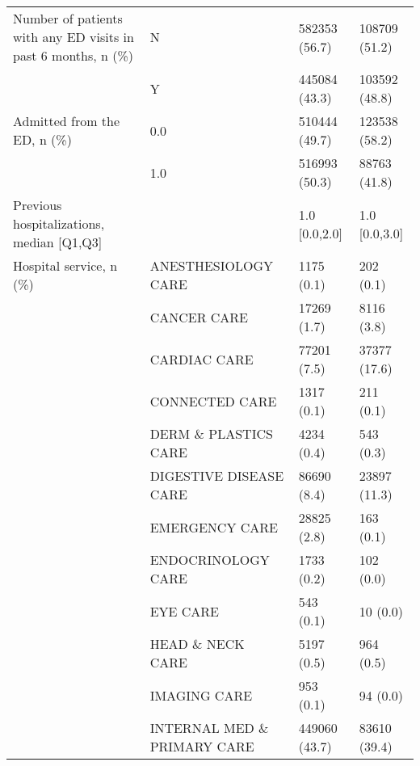 \begin{tabular}{llll}
Number of patients with any ED visits in past 6 months, n (\%) & N &                         582353 (56.7) &     108709 (51.2) \\
                                       & Y &                         445084 (43.3) &     103592 (48.8) \\
Admitted from the ED, n (\%) & 0.0 &                         510444 (49.7) &     123538 (58.2) \\
                                       & 1.0 &                         516993 (50.3) &      88763 (41.8) \\
Previous hospitalizations, median [Q1,Q3] &   &                         1.0 [0.0,2.0] &     1.0 [0.0,3.0] \\
Hospital service, n (\%) & ANESTHESIOLOGY CARE &                            1175 (0.1) &         202 (0.1) \\
                                       & CANCER CARE &                           17269 (1.7) &        8116 (3.8) \\
                                       & CARDIAC CARE &                           77201 (7.5) &      37377 (17.6) \\
                                       & CONNECTED CARE &                            1317 (0.1) &         211 (0.1) \\
                                       & DERM \& PLASTICS CARE &                            4234 (0.4) &         543 (0.3) \\
                                       & DIGESTIVE DISEASE CARE &                           86690 (8.4) &      23897 (11.3) \\
                                       & EMERGENCY CARE &                           28825 (2.8) &         163 (0.1) \\
                                       & ENDOCRINOLOGY CARE &                            1733 (0.2) &         102 (0.0) \\
                                       & EYE CARE &                             543 (0.1) &          10 (0.0) \\
                                       & HEAD \& NECK CARE &                            5197 (0.5) &         964 (0.5) \\
                                       & IMAGING CARE &                             953 (0.1) &          94 (0.0) \\
                                       & INTERNAL MED \& PRIMARY CARE &                         449060 (43.7) &      83610 (39.4) \\

\end{tabular}
